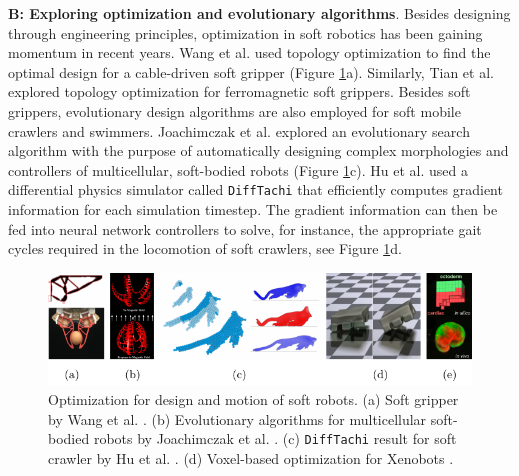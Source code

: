 \textbf{B: Exploring optimization and evolutionary algorithms}. Besides designing through engineering principles, optimization in soft robotics has been gaining momentum in recent years. Wang et al. \cite{Wang2020Nov} used topology optimization to find the optimal design for a cable-driven soft gripper (Figure \ref{fig:C0:optztypes}a). Similarly, Tian et al. \cite{Tian2020May} explored topology optimization for ferromagnetic soft grippers. Besides soft grippers, evolutionary design algorithms are also employed for soft mobile crawlers and swimmers. Joachimczak et al. \cite{Joachimczak2014Jul,Joachimczak2015} explored an evolutionary search algorithm with the purpose of automatically designing complex morphologies and controllers of multicellular, soft-bodied robots (Figure \ref{fig:C0:optztypes}c). Hu et al. \cite{Hu2019taichi} used a differential physics simulator called \texttt{DiffTachi} that efficiently computes gradient information for each simulation timestep. The gradient information can then be fed into neural network controllers to solve, for instance, the appropriate gait cycles required in the locomotion of soft crawlers, see Figure \ref{fig:C0:optztypes}d.

\begin{figure}[!t]
  \vspace{-3mm}
  \includegraphics*[width=\textwidth]{./pdf/thesis-figure-1-3.pdf}
  \vspace{-6mm}
  \caption{Optimization for design and motion of soft robots. (a) Soft gripper by Wang et al. \cite{Wang2020Nov}. (b) Evolutionary algorithms for multicellular soft-bodied robots by Joachimczak et al. \cite{Joachimczak2014Jul,Joachimczak2015}. (c) \texttt{DiffTachi} result for soft crawler by Hu et al. \cite{Hu2019taichi}. (d) Voxel-based optimization for Xenobots \cite{Kriegman2019}.}
  \label{fig:C0:optztypes}
  \vspace{-4mm}
\end{figure}

\vspace{-2mm}
